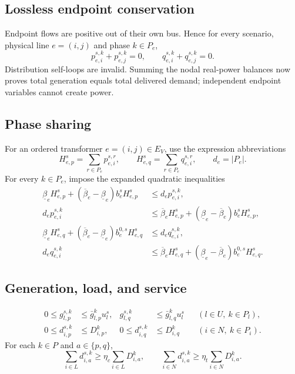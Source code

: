 \documentclass[11pt]{article}
\begin{document}
\subsection{Lossless endpoint conservation}
Endpoint flows are positive out of their own bus. Hence for every scenario,
physical line $e=(i,j)$ and phase $k\in P_e$,
\[
 p_{e,i}^{s,k}+p_{e,j}^{s,k}=0,\qquad
 q_{e,i}^{s,k}+q_{e,j}^{s,k}=0.
\]
Distribution self-loops are invalid. Summing the nodal real-power balances now
proves total generation equals total delivered demand; independent endpoint
variables cannot create power.

\subsection{Phase sharing}
For an ordered transformer $e=(i,j)\in E_V$, use the expression abbreviations
\[
H_{e,p}^s=\sum_{r\in P_e}p_{e,i}^{s,r},\qquad
H_{e,q}^s=\sum_{r\in P_e}q_{e,i}^{s,r},\qquad d_e=|P_e|.
\]
For every $k\in P_e$, impose the expanded quadratic inequalities
\begin{align*}
\underline\beta_e H_{e,p}^s+
 (\overline\beta_e-\underline\beta_e)b_e^sH_{e,p}^s
 &\leq d_e p_{e,i}^{s,k},\\
d_e p_{e,i}^{s,k}
 &\leq\overline\beta_e H_{e,p}^s+
 (\underline\beta_e-\overline\beta_e)b_e^sH_{e,p}^s,\\
\underline\beta_e H_{e,q}^s+
 (\overline\beta_e-\underline\beta_e)b_e^{0,s}H_{e,q}^s
 &\leq d_e q_{e,i}^{s,k},\\
d_e q_{e,i}^{s,k}
 &\leq\overline\beta_e H_{e,q}^s+
 (\underline\beta_e-\overline\beta_e)b_e^{0,s}H_{e,q}^s.
\end{align*}

\subsection{Generation, load, and service}
\begin{align*}
0\leq g_{l,p}^{s,k}&\leq\bar g_{l,p}^k u_l^s,&
g_{l,q}^{s,k}&\leq\bar g_{l,q}^k u_l^s
&& (l\in U,\ k\in P_l),\\
0\leq d_{i,p}^{s,k}&\leq D_{i,p}^k,&
0\leq d_{i,q}^{s,k}&\leq D_{i,q}^k
&& (i\in N,\ k\in P_i).
\end{align*}
For each $k\in P$ and $a\in\{p,q\}$,
\[
\sum_{i\in L}d_{i,a}^{s,k}\geq\eta_c\sum_{i\in L}D_{i,a}^k,
\qquad
\sum_{i\in N}d_{i,a}^{s,k}\geq\eta_t\sum_{i\in N}D_{i,a}^k.
\]
\end{document}

